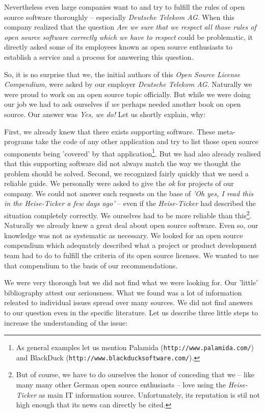 Nevertheless even large companies want to and try to fulfill the rules of open
source software thoroughly -- especially \emph{Deutsche Telekom AG}. When this
company realized that the question \textit{Are we sure that we respect all those
rules of open source software correctly which we have to respect} could be
problematic, it directly asked some of its employees known as open source
enthusiasts to establish a service and a process for answering this question.

So, it is no surprise that we, the initial authors of this \textit{Open Source
License Compendium}, were asked by our employer \emph{Deutsche Telekom AG}.
Naturally we were proud to work on an open source topic officially. But while we
were doing our job we had to ask ourselves if \emph{we} perhaps needed another
book on open source. Our answer was \textit{Yes, we do!} Let us shortly explain,
why:

First, we already knew that there exists supporting software. These
meta-pro\-grams take the code of any other application and try to list those
open source components being 'covered' by that application\footnote{As general
examples let us mention Palamida (\texttt{http://www.palamida.com/}) and
BlackDuck (\texttt{http://www.blackducksoftware.com/}).}. But we had also
already realised that this supporting software did not always match the way we
thought the problem should be solved. Second, we recognized fairly quickly that
we need a reliable guide. We personally were asked to give the \emph{ok} for
projects of our company. We could not answer such requests on the base of
\textit{'Oh yes, I read this in the \emph{Heise-Ticker} a few days ago'} -- even
if the \emph{Heise-Ticker} had described the situation completely correctly. We
ourselves had to be more reliable than this\footnote{But of course, we have to
do ourselves the honor of conceding that we -- like many many other German open
source enthusiasts -- love using the \emph{Heise-Ticker} as main IT information
source. Unfortunately, its reputation is stil not high enough that its news can
directly be cited.}. Naturally we already knew a great deal about open source
software. Even so, our knowledge was not as systematic as necessary. We looked
for an open source compendium which adequately described what a project or
product development team had to do to fulfill the criteria of its open source
licenses. We wanted to use that compendium to the basis of our recommendations.

We were very thorough but we did not find what we were looking for. Our 'little'
bibliography attest our seriousness. What we found was a lot of information
releated to individual issues spread over many sources. We did not find answers
to our question even in the specific literature. Let us describe three little
steps to increase the understanding of the issue:

